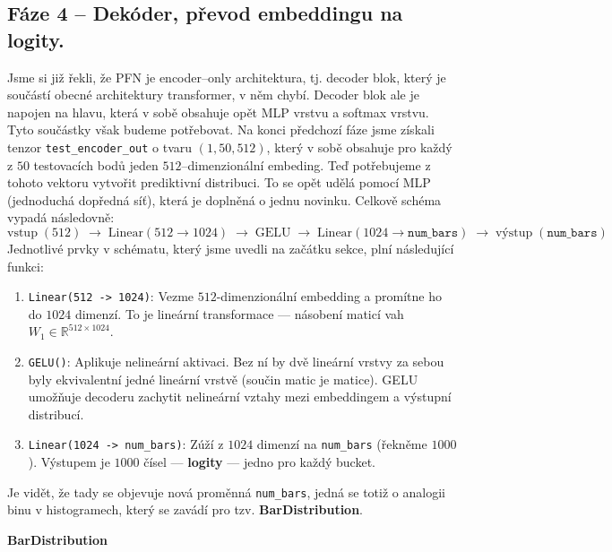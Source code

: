 \subsection{Fáze 4 – Dekóder, převod embeddingu na logity.}
Jsme si již řekli, že PFN je encoder–only architektura, tj. decoder blok, který je součástí obecné architektury transformer, v něm chybí.
Decoder blok ale je napojen na hlavu, která v sobě obsahuje opět MLP vrstvu a softmax vrstvu.
Tyto součástky však budeme potřebovat.
Na konci předchozí fáze jsme získali tenzor \texttt{test\_encoder\_out} o tvaru $(1, 50, 512)$, který v sobě obsahuje pro každý z $50$ testovacích bodů jeden $512$–dimenzionální embeding.
Teď potřebujeme z tohoto vektoru vytvořit prediktivní distribuci.
To se opět udělá pomocí MLP (jednoduchá dopředná síť), která je doplněná o jednu novinku.
Celkově schéma vypadá následovně:
$$\text{vstup}\;(512) \;\to\; \text{Linear}(512 \to 1024) \;\to\; \text{GELU} \;\to\; \text{Linear}(1024 \to \texttt{num\_bars}) \;\to\; \text{výstup}\;(\texttt{num\_bars})$$
Jednotlivé prvky v schématu, který jsme uvedli na začátku sekce, plní následující funkci:
\begin{enumerate}
    \item \lstinline|Linear(512 -> 1024)|: Vezme $512$-dimenzionální embedding a promítne ho do $1024$ dimenzí. To je lineární transformace — násobení maticí vah $W_1 \in \mathbb{R}^{512 \times 1024}$.
    \item \lstinline|GELU()|: Aplikuje nelineární aktivaci. Bez ní by dvě lineární vrstvy za sebou byly ekvivalentní jedné lineární vrstvě (součin matic je matice). GELU umožňuje decoderu zachytit nelineární vztahy mezi embeddingem a výstupní distribucí.
    \item \lstinline|Linear(1024 -> num_bars)|: Zúží z $1024$ dimenzí na \lstinline|num_bars| (řekněme $1000$). Výstupem je $1000$ čísel — \textbf{logity} — jedno pro každý bucket.
\end{enumerate}
Je vidět, že tady se objevuje nová proměnná \texttt{num\_bars}, jedná se totiž o analogii binu v histogramech, který se zavádí pro tzv. \textbf{BarDistribution}.

\textbf{BarDistribution}

